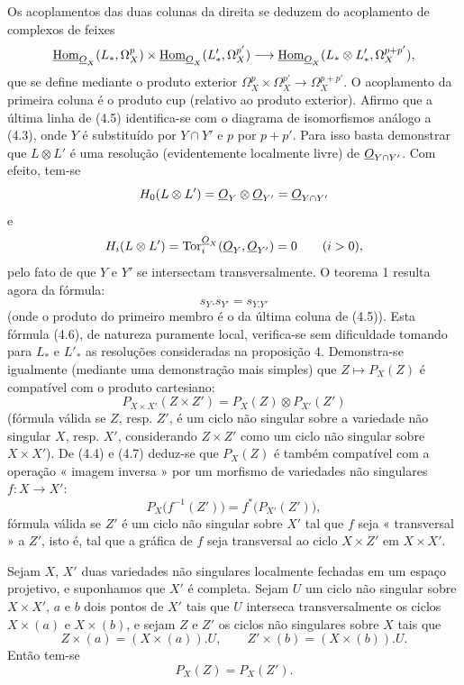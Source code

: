 Os acoplamentos das duas colunas da direita se deduzem do acoplamento de
complexos de feixes
\[
\underline{\operatorname{Hom}}_{\underline{O}_X}(L_{*},\Omega_X^{p})
\times\underline{\operatorname{Hom}}_{\underline{O}_X}(L'_{*},\Omega_X^{p'})
\longrightarrow
\underline{\operatorname{Hom}}_{\underline{O}_X}(L_{*}\otimes L'_{*},\Omega_X^{p+p'}),
\]
que se define mediante o produto exterior
$\Omega_X^{p}\times\Omega_X^{p'}\longrightarrow\Omega_X^{p+p'}$.
O acoplamento da primeira coluna é o produto cup (relativo ao produto
exterior). Afirmo que a última linha de (4.5) identifica-se com o diagrama
de isomorfismos análogo a (4.3), onde $Y$ é substituído por $Y\cap Y'$ e $p$ por
$p+p'$. Para isso basta demonstrar que $L\otimes L'$ é uma resolução
(evidentemente localmente livre) de $\underline{O}_{Y\cap Y'}$. Com efeito, tem-se
\[
  H_0(L\otimes L')=\underline{O}_Y\otimes\underline{O}_{Y'}=\underline{O}_{Y\cap Y'}
\]
e
\[
  H_i(L\otimes L')=\operatorname{Tor}_{i}^{\underline{O}_X}(\underline{O}_Y,\underline{O}_{Y'})=0
  \qquad(i>0),
\]
pelo fato de que $Y$ e $Y'$ se intersectam transversalmente. O teorema 1 resulta
agora da fórmula:
\begin{equation}\tag{4.6}
  s_Y.s_{Y'}=s_{Y.Y'}
\end{equation}
(onde o produto do primeiro membro é o da última coluna de (4.5)).
Esta fórmula (4.6), de natureza puramente local, verifica-se sem dificuldade
tomando para $L_{*}$ e $L'_{*}$ as resoluções consideradas na proposição
4. Demonstra-se igualmente (mediante uma demonstração mais simples) que
$Z\longmapsto P_X(Z)$ é compatível com o produto cartesiano:
\begin{equation}\tag{4.7}
  P_{X\times X'}(Z\times Z')=P_X(Z)\otimes P_{X'}(Z')
\end{equation}
(fórmula válida se $Z$, resp. $Z'$, é um ciclo não singular sobre a variedade
não singular $X$, resp. $X'$, considerando $Z\times Z'$ como um ciclo não
singular sobre $X\times X'$). De (4.4) e (4.7) deduz-se que $P_X(Z)$ é também
compatível com a operação « imagem inversa » por um morfismo de variedades não
singulares $f:X\longrightarrow X'$:
\begin{equation}\tag{4.8}
  P_X\bigl(f^{-1}(Z')\bigr)=f^{*}\bigl(P_{X'}(Z')\bigr),
\end{equation}
fórmula válida se $Z'$ é um ciclo não singular sobre $X'$ tal que $f$ seja
« transversal » a $Z'$, isto é, tal que a gráfica de $f$ seja transversal ao ciclo
$X\times Z'$ em $X\times X'$.

 Sejam $X$, $X'$ duas variedades não singulares
localmente fechadas em um espaço projetivo, e suponhamos que $X'$ é completa. Sejam $U$
um ciclo não singular sobre $X\times X'$, $a$ e $b$ dois pontos de $X'$ tais que
$U$ interseca transversalmente os ciclos $X\times(a)$ e $X\times(b)$, e sejam $Z$
e $Z'$ os ciclos não singulares sobre $X$ tais que
\[
  Z\times(a)=(X\times(a)).U,
  \qquad
  Z'\times(b)=(X\times(b)).U.
\]
Então tem-se
\[
  P_X(Z)=P_X(Z').
\]

